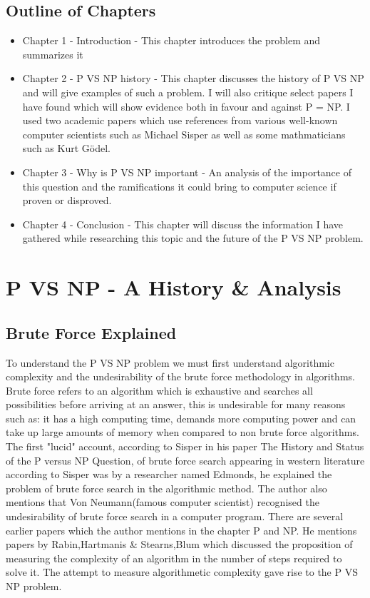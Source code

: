 \documentclass{report}
\begin{document}
\section{Outline of Chapters}
\begin{itemize}
  \item Chapter 1 - Introduction - This chapter introduces the problem and summarizes it
  \item  Chapter 2 - P VS NP history - This chapter discusses the history of P VS NP and will give examples of such a problem.  I will also critique select papers I have found which will show evidence both in favour and against P = NP.  I used two academic papers which use references from various well-known computer scientists such as Michael Sisper as well as some mathmaticians such as Kurt Gödel.
  \item Chapter 3 - Why is P VS NP important - An analysis of the importance of this question and the ramifications it could bring to computer science if proven or disproved.
  \item Chapter 4 - Conclusion - This chapter will discuss the information I have gathered while researching this topic and the future of the P VS NP problem.
\end{itemize}
\chapter{P VS NP - A History \& Analysis}
\section{Brute Force Explained}
To understand the P VS NP problem we must first understand algorithmic complexity and the undesirability of the brute force methodology in algorithms.
Brute force refers to an algorithm which is exhaustive and searches all possibilities before arriving at an answer, this is undesirable for many reasons such as: it has a high computing time, demands more computing power and can take up large amounts of memory when compared to non brute force algorithms.  The first "lucid" account, according to Sisper in his paper The History and Status of the P versus NP Question, of brute force search appearing in western literature according to Sisper was by a researcher named Edmonds\cite{HistoryOfPVsNP}, he explained the problem of brute force search in the algorithmic method.  The author also mentions that Von Neumann(famous computer scientist\cite{Neumann}) recognised the undesirability of brute force search in a computer program. There are several earlier papers which the author mentions in the chapter P and NP. He mentions papers by Rabin\cite{ResearchPaperRabin},Hartmanis \& Stearns\cite{ResearchPaperHartmanis},Blum\cite{ResearchPaperBlum} which discussed the proposition of measuring the complexity of an algorithm in the number of steps required to solve it. The attempt to measure algorithmetic complexity gave rise to the P VS NP problem.
\end{document}
